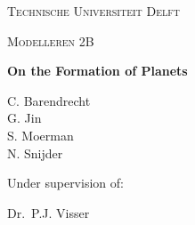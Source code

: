 
\begin{titlepage}
	
	\centering
	{\scshape\Large {\color{white}Technische Universiteit Delft}\par}
	\vspace{1cm}
	{\scshape\Large {\color{white}Modelleren 2B}\par}
	\vspace{1.5cm}
	{\Huge\bfseries {\color{white}On the Formation of Planets}\par}
	\vspace{2cm}
	{\Large{\color{white}
	C. Barendrecht\\ 
	G. Jin\\
	S. Moerman\\
	N. Snijder}\par}
	\vfill
	{\color{white}Under supervision of:\par
	Dr.~P.J. Visser}

	\vfill
\end{titlepage}
\ClearWallPaper
\blankpage
%